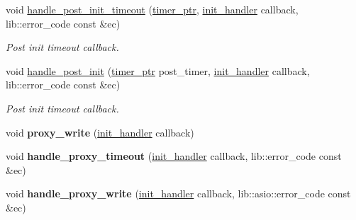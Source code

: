 \begin{DoxyCompactItemize}
\item 
void \mbox{\hyperlink{classwebsocketpp_1_1transport_1_1asio_1_1connection_a8c21e2814d440c6fe49a4514f6cf5ff1}{handle\+\_\+post\+\_\+init\+\_\+timeout}} (\mbox{\hyperlink{classwebsocketpp_1_1transport_1_1asio_1_1connection_a96d8a6cd5cf1120208b206da109a194e}{timer\+\_\+ptr}}, \mbox{\hyperlink{namespacewebsocketpp_1_1transport_aeae75e675c1a334b3b33ab7120b480a5}{init\+\_\+handler}} callback, lib\+::error\+\_\+code const \&ec)
\begin{DoxyCompactList}\small\item\em Post init timeout callback. \end{DoxyCompactList}\item 
void \mbox{\hyperlink{classwebsocketpp_1_1transport_1_1asio_1_1connection_a6782049b9d8b324d85da34dd9e426950}{handle\+\_\+post\+\_\+init}} (\mbox{\hyperlink{classwebsocketpp_1_1transport_1_1asio_1_1connection_a96d8a6cd5cf1120208b206da109a194e}{timer\+\_\+ptr}} post\+\_\+timer, \mbox{\hyperlink{namespacewebsocketpp_1_1transport_aeae75e675c1a334b3b33ab7120b480a5}{init\+\_\+handler}} callback, lib\+::error\+\_\+code const \&ec)
\begin{DoxyCompactList}\small\item\em Post init timeout callback. \end{DoxyCompactList}\item 
\mbox{\label{classwebsocketpp_1_1transport_1_1asio_1_1connection_a55e3fac0ec05389d6765a6496922f099}} 
void {\bfseries proxy\+\_\+write} (\mbox{\hyperlink{namespacewebsocketpp_1_1transport_aeae75e675c1a334b3b33ab7120b480a5}{init\+\_\+handler}} callback)
\item 
\mbox{\label{classwebsocketpp_1_1transport_1_1asio_1_1connection_a5bf6d19bdada66f4880182f632fe88e0}} 
void {\bfseries handle\+\_\+proxy\+\_\+timeout} (\mbox{\hyperlink{namespacewebsocketpp_1_1transport_aeae75e675c1a334b3b33ab7120b480a5}{init\+\_\+handler}} callback, lib\+::error\+\_\+code const \&ec)
\item 
\mbox{\label{classwebsocketpp_1_1transport_1_1asio_1_1connection_a5684daf9e8ee3e0447694d4376832917}} 
void {\bfseries handle\+\_\+proxy\+\_\+write} (\mbox{\hyperlink{namespacewebsocketpp_1_1transport_aeae75e675c1a334b3b33ab7120b480a5}{init\+\_\+handler}} callback, lib\+::asio\+::error\+\_\+code const \&ec)

\end{DoxyCompactItemize}
